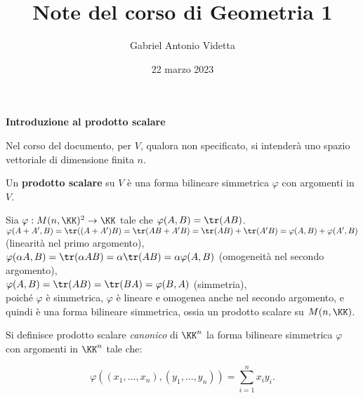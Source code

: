 \documentclass[11pt]{article}
\title{\textbf{Note del corso di Geometria 1}}
\author{Gabriel Antonio Videtta}
\date{22 marzo 2023}
\begin{document}
	
	\maketitle
	
	\begin{center}
		\Large \textbf{Introduzione al prodotto scalare}
	\end{center}

	\begin{note}
		Nel corso del documento, per $V$, qualora non specificato, si intenderà uno spazio vettoriale di dimensione
		finita $n$.
	\end{note}

	\begin{definition}
		Un \textbf{prodotto scalare} su $V$ è una forma bilineare simmetrica $\varphi$ con argomenti in $V$.
	\end{definition}

	\begin{example}
		Sia $\varphi : M(n, \KK)^2 \to \KK$ tale che $\varphi(A, B) = \tr(AB)$. \\
		
		\li $\varphi(A + A', B) = \tr((A + A')B) = \tr(AB + A'B) = \tr(AB) + \tr(A'B) = \varphi(A, B) + \varphi(A', B)$ (linearità
		nel primo argomento), \\
		\li $\varphi(\alpha A, B) = \tr(\alpha A B) = \alpha \tr(AB) = \alpha \varphi(A, B)$ (omogeneità nel secondo argomento), \\
		\li $\varphi(A, B) = \tr(AB) = \tr(BA) = \varphi(B, A)$ (simmetria), \\
		\li poiché $\varphi$ è simmetrica, $\varphi$ è lineare e omogenea anche nel secondo argomento, e quindi è una
		forma bilineare simmetrica, ossia un prodotto scalare su $M(n, \KK)$.
	\end{example}

	\begin{definition}
		Si definisce prodotto scalare \textit{canonico} di $\KK^n$ la forma bilineare simmetrica $\varphi$ con
		argomenti in $\KK^n$ tale che:
		
		\[ \varphi((x_1, ..., x_n), (y_1, ..., y_n)) = \sum_{i=1}^n x_i y_i. \]
	\end{definition}
\end{document}
